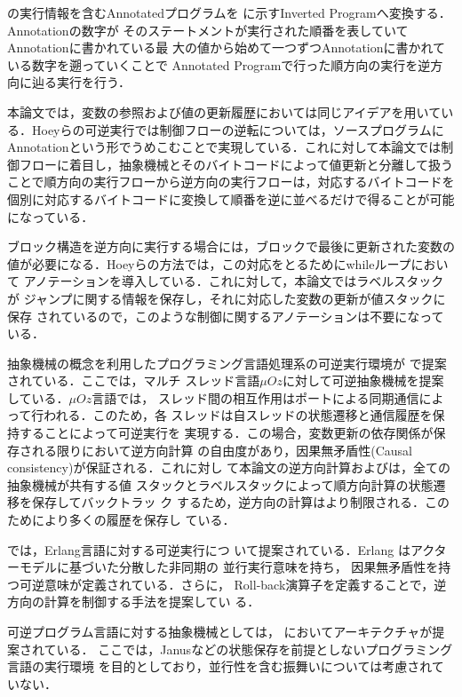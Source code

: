 \documentclass[submit,PRO]{ipsj}
\begin{document}
の実行情報を含むAnnotatedプログラムを
に示すInverted Programへ変換する．Annotationの数字が
そのステートメントが実行された順番を表していてAnnotationに書かれている最
大の値から始めて一つずつAnnotationに書かれている数字を遡っていくことで
Annotated Programで行った順方向の実行を逆方向に辿る実行を行う．

本論文では，変数の参照および値の更新履歴においては同じアイデアを用いてい
る．Hoeyらの可逆実行では制御フローの逆転については，ソースプログラムに
Annotationという形でうめこむことで実現している．これに対して本論文では制
御フローに着目し，抽象機械とそのバイトコードによって値更新と分離して扱う
ことで順方向の実行フローから逆方向の実行フローは，対応するバイトコードを
個別に対応するバイトコードに変換して順番を逆に並べるだけで得ることが可能
になっている．

ブロック構造を逆方向に実行する場合には，ブロックで最後に更新された変数の
値が必要になる．Hoeyらの方法では，この対応をとるためにwhileループにおいて
アノテーションを導入している．これに対して，本論文ではラベルスタックが
ジャンプに関する情報を保存し，それに対応した変数の更新が値スタックに保存
されているので，このような制御に関するアノテーションは不要になっている．

抽象機械の概念を利用したプログラミング言語処理系の可逆実行環境が
\cite{DBLP:conf/forte/LienhardtLMS12}で提案されている．ここでは，マルチ
スレッド言語$\mu Oz$に対して可逆抽象機械を提案している．$\mu Oz$言語では，
スレッド間の相互作用はポートによる同期通信によって行われる．このため，各
スレッドは自スレッドの状態遷移と通信履歴を保持することによって可逆実行を
実現する．この場合，変数更新の依存関係が保存される限りにおいて逆方向計算
の自由度があり，因果無矛盾性(Causal consistency)が保証される．これに対し
て本論文の逆方向計算および\cite{Hoey20PHD}は，全ての抽象機械が共有する値
スタックとラベルスタックによって順方向計算の状態遷移を保存してバックトラッ
ク
\cite{DBLP:journals/software/AgrawalDS91,DBLP:journals/corr/abs-1709-00828}
するため，逆方向の計算はより制限される．このためにより多くの履歴を保存し
ている．

\cite{DBLP:journals/jlp/LaneseNPV18}では，Erlang言語に対する可逆実行につ
いて提案されている．Erlang%
はアクターモデルに基づいた分散した非同期の%
並行実行意味を持ち，%
因果無矛盾性を持つ可逆意味が定義されている．さらに，
Roll-back演算子を定義することで，逆方向の計算を制御する手法を提案してい
る．

可逆プログラム言語に対する抽象機械としては，
\cite{DBLP:conf/csr/AxelsenGY07}においてアーキテクチャが提案されている．
ここでは，Janusなどの状態保存を前提としないプログラミング言語の実行環境
を目的としており，並行性を含む振舞いについては考慮されていない．
\end{document}
